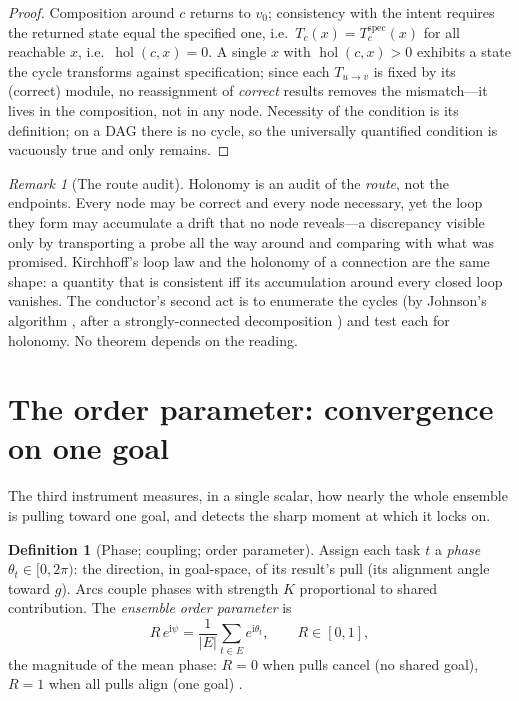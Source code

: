 \documentclass[twocolumn,11pt,a4paper]{article}
\theoremstyle{sup}
\theoremstyle{definition}
\newtheorem{definition}[theorem]{Definition}
\theoremstyle{remark}
\newtheorem{remark}[theorem]{Remark}
\DeclareMathOperator{\hol}{hol}
\newcommand{\task}{t}
\newcommand{\Ens}{E}                  %
\newcommand{\Rens}{R}                 %
\newcommand{\abs}[1]{\lvert#1\rvert}
\begin{document}
\begin{proof}
Composition around $c$ returns to $v_0$; consistency with the intent requires the
returned state equal the specified one, i.e.\ $T_c(x)=T_c^{\mathrm{spec}}(x)$ for
all reachable $x$, i.e.\ $\hol(c,x)=0$. A single $x$ with $\hol(c,x)>0$ exhibits a
state the cycle transforms against specification; since each $T_{u\to v}$ is fixed
by its (correct) module, no reassignment of \emph{correct} results removes the
mismatch---it lives in the composition, not in any node. Necessity of the
condition is its definition; on a DAG there is no cycle, so the universally
quantified condition is vacuously true and only  remains.
\end{proof}

\begin{remark}[The route audit]
\label{rem:route}
Holonomy is an audit of the \emph{route}, not the endpoints. Every node may be
correct and every node necessary, yet the loop they form may accumulate a drift
that no node reveals---a discrepancy visible only by transporting a probe all the
way around and comparing with what was promised. Kirchhoff's loop law
\citep{kirchhoff1847} and the holonomy of a connection
\citep{kobayashinomizu1963} are the same shape: a quantity that is consistent iff
its accumulation around every closed loop vanishes. The conductor's second act is
to enumerate the cycles (by Johnson's algorithm \citep{johnson1975}, after a
strongly-connected decomposition \citep{tarjan1972}) and test each for holonomy.
No theorem depends on the reading.
\end{remark}

\section{The order parameter: convergence on one goal}
\label{sec:order}

The third instrument measures, in a single scalar, how nearly the whole ensemble
is pulling toward one goal, and detects the sharp moment at which it locks on.

\begin{definition}[Phase; coupling; order parameter]
\label{def:order}
Assign each task $\task$ a \emph{phase} $\theta_\task\in[0,2\pi)$: the direction,
in goal-space, of its result's pull (its alignment angle toward $g$). Arcs couple
phases with strength $K$ proportional to shared contribution. The \emph{ensemble
order parameter} is
\[
\Rens\,e^{\mathrm i\psi}=\frac1{\abs\Ens}\sum_{\task\in\Ens}e^{\mathrm
i\theta_\task},\qquad \Rens\in[0,1],
\]
the magnitude of the mean phase: $\Rens=0$ when pulls cancel (no shared goal),
$\Rens=1$ when all pulls align (one goal) \citep{kuramoto1975,kuramoto1984,
strogatz2000}.
\end{definition}
\end{document}
